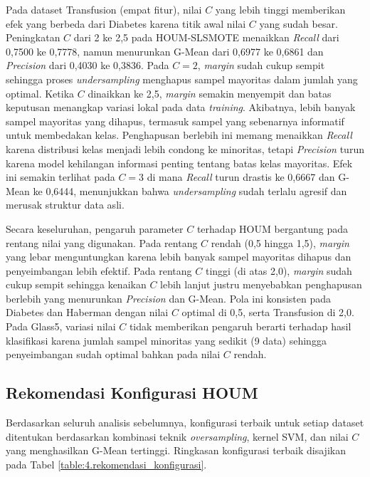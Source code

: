 Pada dataset Transfusion (empat fitur), nilai $C$ yang lebih tinggi memberikan efek yang berbeda dari Diabetes karena titik awal nilai $C$ yang sudah besar. Peningkatan $C$ dari 2 ke 2,5 pada HOUM-SLSMOTE menaikkan \textit{Recall} dari 0,7500 ke 0,7778, namun menurunkan G-Mean dari 0,6977 ke 0,6861 dan \textit{Precision} dari 0,4030 ke 0,3836. Pada $C=2$, \textit{margin} sudah cukup sempit sehingga proses \textit{undersampling} menghapus sampel mayoritas dalam jumlah yang optimal. Ketika $C$ dinaikkan ke 2,5, \textit{margin} semakin menyempit dan batas keputusan menangkap variasi lokal pada data \textit{training}. Akibatnya, lebih banyak sampel mayoritas yang dihapus, termasuk sampel yang sebenarnya informatif untuk membedakan kelas. Penghapusan berlebih ini memang menaikkan \textit{Recall} karena distribusi kelas menjadi lebih condong ke minoritas, tetapi \textit{Precision} turun karena model kehilangan informasi penting tentang batas kelas mayoritas. Efek ini semakin terlihat pada $C=3$ di mana \textit{Recall} turun drastis ke 0,6667 dan G-Mean ke 0,6444, menunjukkan bahwa \textit{undersampling} sudah terlalu agresif dan merusak struktur data asli. \par

Secara keseluruhan, pengaruh parameter $C$ terhadap HOUM bergantung pada rentang nilai yang digunakan. Pada rentang $C$ rendah (0,5 hingga 1,5), \textit{margin} yang lebar menguntungkan karena lebih banyak sampel mayoritas dihapus dan penyeimbangan lebih efektif. Pada rentang $C$ tinggi (di atas 2,0), \textit{margin} sudah cukup sempit sehingga kenaikan $C$ lebih lanjut justru menyebabkan penghapusan berlebih yang menurunkan \textit{Precision} dan G-Mean. Pola ini konsisten pada Diabetes dan Haberman dengan nilai $C$ optimal di 0,5, serta Transfusion di 2,0. Pada Glass5, variasi nilai $C$ tidak memberikan pengaruh berarti terhadap hasil klasifikasi karena jumlah sampel minoritas yang sedikit (9 data) sehingga penyeimbangan sudah optimal bahkan pada nilai $C$ rendah. \par
\subsection{Rekomendasi Konfigurasi HOUM} \label{IV.Rekomendasi}
Berdasarkan seluruh analisis sebelumnya, konfigurasi terbaik untuk setiap dataset ditentukan berdasarkan kombinasi teknik \textit{oversampling}, kernel SVM, dan nilai $C$ yang menghasilkan G-Mean tertinggi. Ringkasan konfigurasi terbaik disajikan pada Tabel \ref{table:4.rekomendasi_konfigurasi}.


